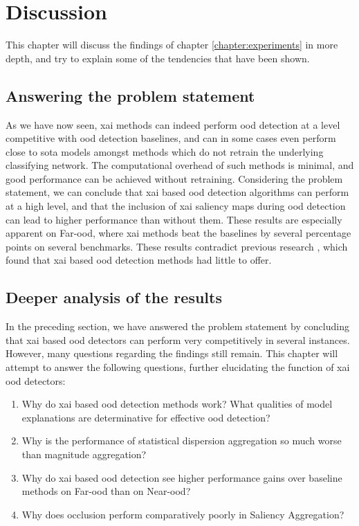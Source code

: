 \documentclass[UKenglish]{uiomasterthesis} %
\theoremstyle{definition}
\begin{document}
\chapter{Discussion} \label{chapter:discussion}

This chapter will discuss the findings of chapter \ref{chapter:experiments} in more depth, and try to explain some of the tendencies that have been shown.

\section{Answering the problem statement}

As we have now seen, \ac{xai} methods can indeed perform \ac{ood} detection at a level competitive with \ac{ood} detection baselines, and can in some cases even perform close to \ac{sota} models amongst methods which do not retrain the underlying classifying network. The computational overhead of such methods is minimal, and good performance can be achieved without retraining. Considering the problem statement, we can conclude that \ac{xai} based \ac{ood} detection algorithms can perform at a high level, and that the inclusion of \ac{xai} saliency maps during \ac{ood} detection can lead to higher performance than without them. These results are especially apparent on Far-\ac{ood}, where \ac{xai} methods beat the baselines by several percentage points on several benchmarks. These results contradict previous research \cite{martinez}, which found that \ac{xai} based \ac{ood} detection methods had little to offer.

\section{Deeper analysis of the results}

In the preceding section, we have answered the problem statement by concluding that \ac{xai} based \ac{ood} detectors can perform very competitively in several instances. However, many questions regarding the findings still remain. This chapter will attempt to answer the following questions, further elucidating the function of \ac{xai} \ac{ood} detectors:

\begin{enumerate}
    \item Why do \ac{xai} based \ac{ood} detection methods work? What qualities of model explanations are determinative for effective \ac{ood} detection?
    \item Why is the performance of statistical dispersion aggregation so much worse than magnitude aggregation?
    \item Why do \ac{xai} based \ac{ood} detection see higher performance gains over baseline methods on Far-\ac{ood} than on Near-\ac{ood}?
    \item Why does occlusion perform comparatively poorly in Saliency Aggregation?
\end{enumerate}
\end{document}
